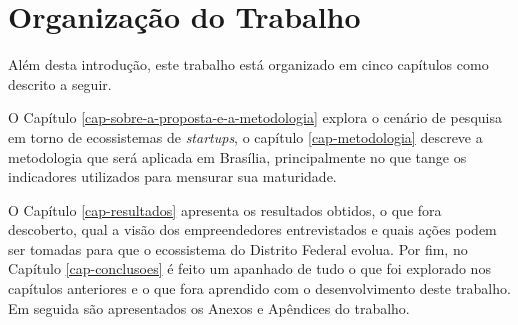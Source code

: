\section{Organização do Trabalho}
\label{section:organizacao_do_trabalho}

Além desta introdução, este trabalho está organizado em cinco capítulos como descrito a seguir.

O Capítulo \ref{cap-sobre-a-proposta-e-a-metodologia} explora o cenário de pesquisa em torno de ecossistemas de \textit{startups}, o capítulo \ref{cap-metodologia} descreve a metodologia que será aplicada em Brasília, principalmente no que tange os indicadores utilizados para mensurar sua maturidade.

O Capítulo \ref{cap-resultados} apresenta os resultados obtidos, o que fora descoberto, qual a visão dos empreendedores entrevistados e quais ações podem ser tomadas para que o ecossistema do Distrito Federal evolua. Por fim, no Capítulo \ref{cap-conclusoes} é feito um apanhado de tudo o que foi explorado nos capítulos anteriores e o que fora aprendido com o desenvolvimento deste trabalho. Em seguida são apresentados os Anexos e Apêndices do trabalho.

